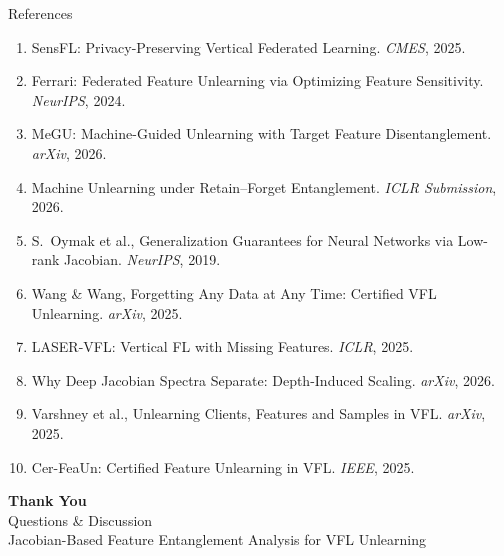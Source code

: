 \documentclass[aspectratio=169, 11pt]{beamer}
\begin{document}
\begin{frame}[allowframebreaks]{References}
  \footnotesize
  \begin{enumerate}
    \item SensFL: Privacy-Preserving Vertical Federated Learning. \textit{CMES}, 2025.
    \item Ferrari: Federated Feature Unlearning via Optimizing Feature Sensitivity. \textit{NeurIPS}, 2024.
    \item MeGU: Machine-Guided Unlearning with Target Feature Disentanglement. \textit{arXiv}, 2026.
    \item Machine Unlearning under Retain--Forget Entanglement. \textit{ICLR Submission}, 2026.
    \item S.\ Oymak et al., Generalization Guarantees for Neural Networks via Low-rank Jacobian. \textit{NeurIPS}, 2019.
    \item Wang \& Wang, Forgetting Any Data at Any Time: Certified VFL Unlearning. \textit{arXiv}, 2025.
    \item LASER-VFL: Vertical FL with Missing Features. \textit{ICLR}, 2025.
    \item Why Deep Jacobian Spectra Separate: Depth-Induced Scaling. \textit{arXiv}, 2026.
    \item Varshney et al., Unlearning Clients, Features and Samples in VFL. \textit{arXiv}, 2025.
    \item Cer-FeaUn: Certified Feature Unlearning in VFL. \textit{IEEE}, 2025.
  \end{enumerate}
\end{frame}

\begin{frame}{}
  \begin{center}
    \vspace{1.5cm}
    {\Huge\bfseries\textcolor{deepblue}{Thank You}}\\[0.8cm]
    {\large Questions \& Discussion}\\[0.5cm]
    {\footnotesize Jacobian-Based Feature Entanglement Analysis for VFL Unlearning}
  \end{center}
\end{frame}
\end{document}
